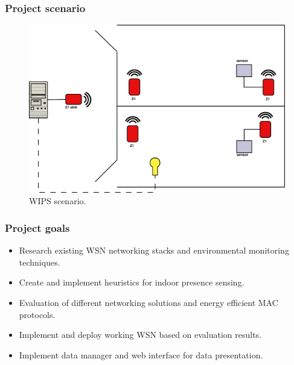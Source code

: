 \documentclass{beamer}
\begin{document}
\begin{frame}
\frametitle{Project scenario}
	
	\begin{figure}
		\includegraphics[width=\textwidth]{system.eps}
		\caption{WIPS scenario.}
	\end{figure}
	
\end{frame}

\begin{frame}
\frametitle{Project goals}

	\begin{block}

		\begin{itemize}

			\item
Research existing WSN networking stacks and environmental monitoring techniques.
			\item
Create and implement heuristics for indoor presence sensing.
			\item
Evaluation of different networking solutions and energy efficient MAC protocols.
			\item
Implement and deploy working WSN based on evaluation results.
			\item
Implement data manager and web interface for data presentation.
		
		\end{itemize}

	\end{block}

\end{frame}
\end{document}
